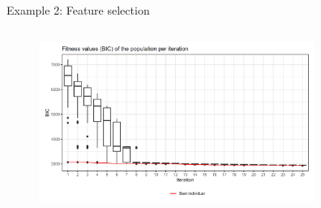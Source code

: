 \documentclass[11pt,compress,t,notes=noshow, xcolor=table]{beamer}
\begin{document}
\begin{vbframe}{Example 2: Feature selection}








\vspace{0.5cm}
\begin{center}
\begin{figure}
  \includegraphics[height = 6cm, width = 9cm]{figure_man/var-selection1.png}
\end{figure}
\end{center}


\end{vbframe}
\end{document}

